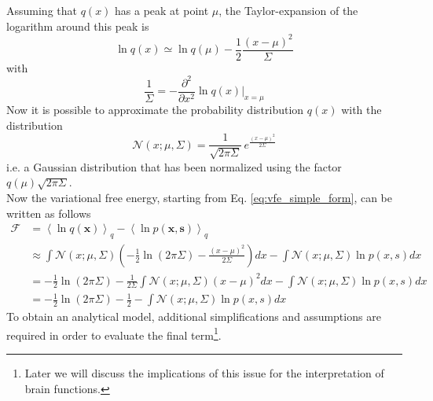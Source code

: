 \documentclass[10pt]{article}
\begin{document}
Assuming that $q(x)$ has a peak at point $\mu$, the Taylor-expansion of the logarithm around this peak is
\begin{equation}
\ln q(x) \simeq \ln q(\mu) - \frac{1}{2} \frac{(x-\mu)^2}{\Sigma} 
\end{equation}
with
\begin{equation}
\frac{1}{\Sigma} = - \frac{\partial^{2} }{\partial x^2} \ln q(x) \bigg\rvert_{x=\mu} 
\end{equation}
Now it is possible to approximate the probability distribution $q(x)$ with the distribution
\begin{equation}
\mathcal{N}(x;\mu, \Sigma) = \frac{1}{\sqrt{ 2 \pi \Sigma}} \, e^{\frac{(x-\mu)^2}{2 \Sigma}}
\end{equation}
i.e. a Gaussian distribution that has been normalized using the factor $q(\mu) \sqrt{2 \pi \Sigma }$.\\
Now the variational free energy, starting from Eq. \ref{eq:vfe_simple_form}, can be written as follows
\begin{equation}
\begin{split}
\mathcal{F}   &= \left< \ln q(\bm x) \right>_{q} - \left< \ln p(\bm x,\bm s) \right>_{q}  \\
    &\approx \int \mathcal{N}(x;\mu,\Sigma) (-\frac{1}{2} \ln (2 \pi \Sigma) - \frac{(x-\mu)^2}{2 \Sigma} ) d x - \int \mathcal{N}(x;\mu,\Sigma) \ln p(x,s) d x \\
    & = -\frac{1}{2} \ln (2 \pi \Sigma) - \frac{1}{2 \Sigma} \int \mathcal{N}(x;\mu,\Sigma) (x-\mu)^2  d x - \int \mathcal{N}(x;\mu,\Sigma) \ln p(x,s) d x \\
    & = -\frac{1}{2} \ln (2 \pi \Sigma) - \frac{1}{2} - \int \mathcal{N}(x;\mu,\Sigma) \ln p(x,s) d x
\end{split}
\end{equation}
To obtain an analytical model, additional simplifications and assumptions are required in order to evaluate the final term\footnote{Later we will discuss the implications of this issue for the interpretation of brain functions.}. 
\end{document}
